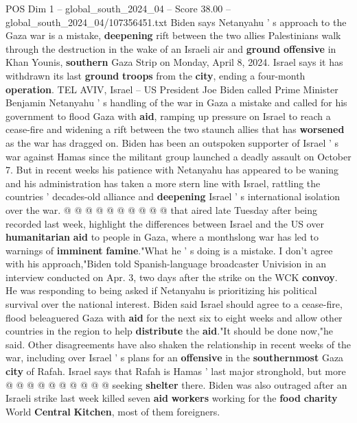 \begin{textsample}{POS Dim 1 – global\_south\_2024\_04 – Score 38.00 – global\_south\_2024\_04/107356451.txt}  \label{ex:f1_pos_141}
Biden says Netanyahu ' s approach to the Gaza war is a mistake, \textbf{deepening} rift between the two allies Palestinians walk through the destruction in the wake of an Israeli air and \textbf{ground} \textbf{offensive} in Khan Younis, \textbf{southern} Gaza Strip on Monday, April 8, 2024.
Israel says it has withdrawn its last \textbf{ground} \textbf{troops} from the \textbf{city}, ending a four-month \textbf{operation}.
TEL AVIV, Israel -- US President Joe Biden called Prime Minister Benjamin Netanyahu ' s handling of the war in Gaza a mistake and called for his government to flood Gaza with \textbf{aid}, ramping up pressure on Israel to reach a cease-fire and widening a rift between the two staunch allies that has \textbf{worsened} as the war has dragged on.
Biden has been an outspoken supporter of Israel ' s war against Hamas since the militant group launched a deadly assault on October 7.
But in recent weeks his patience with Netanyahu has appeared to be waning and his administration has taken a more stern line with Israel, rattling the countries ' decades-old alliance and \textbf{deepening} Israel ' s international isolation over the war. @ @ @ @ @ @ @ @ @ @ that aired late Tuesday after being recorded last week, highlight the differences between Israel and the US over \textbf{humanitarian} \textbf{aid} to people in Gaza, where a monthslong war has led to warnings of \textbf{imminent} \textbf{famine}."What he ' s doing is a mistake.
I don't agree with his approach,"Biden told Spanish-language broadcaster Univision in an interview conducted on Apr. 3, two days after the strike on the WCK \textbf{convoy}.
He was responding to being asked if Netanyahu is prioritizing his political survival over the national interest.
Biden said Israel should agree to a cease-fire, flood beleaguered Gaza with \textbf{aid} for the next six to eight weeks and allow other countries in the region to help \textbf{distribute} the \textbf{aid}."It should be done now,"he said.
Other disagreements have also shaken the relationship in recent weeks of the war, including over Israel ' s plans for an \textbf{offensive} in the \textbf{southernmost} Gaza \textbf{city} of Rafah.
Israel says that Rafah is Hamas ' last major stronghold, but more @ @ @ @ @ @ @ @ @ @ seeking \textbf{shelter} there.
Biden was also outraged after an Israeli strike last week killed seven \textbf{aid} \textbf{workers} working for the \textbf{food} \textbf{charity} World \textbf{Central} \textbf{Kitchen}, most of them foreigners.

\end{textsample}
